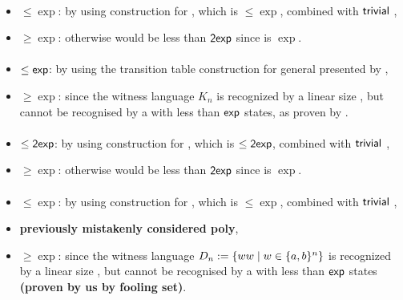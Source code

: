 \paragraph{\OMOLA{}\tto\TNFA}
\begin{itemize}
	\item $\le\exp$: by using construction for \hyperref[cost:OM1LAto1NFA]{\OMOLA{}\tto\ONFA}, which is $\le\exp$, combined with $\mathsf{trivial}$ \ONFA{}\tto\TNFA,
	\item $\ge\exp$: otherwise \hyperref[cost:OM1LAto1DFA]{\OMOLA{}\tto\ODFA} would be less than $\mathsf{2exp}$ since \hyperref[cost:2NFAto1DFA]{\TNFA{}\tto\ODFA} is $\exp$.
\end{itemize}
\paragraph{\OMODLA{}\tto\ODFA}\label{cost:OM1DLAto1DFA}
\begin{itemize}
	\item $\le\mathsf{exp}$: by using the transition table construction for general \OLA presented by ,
	\item $\ge\exp$: since the witness language $K_n$ is recognized by a linear size \OMODLA, but cannot be recognised by a \TNFA with less than $\mathsf{exp}$ states, as proven by .
\end{itemize}
\paragraph{\OMOLA{}\tto\OMODLA}
\begin{itemize}
	\item $\le\mathsf{2exp}$: by using construction for \hyperref[cost:OM1LAto1DFA]{\OMOLA{}\tto\ODFA}, which is $\le\mathsf{2exp}$, combined with $\mathsf{trivial}$ \ODFA{}\tto\OMODLA,
	\item $\ge\exp$: otherwise \hyperref[cost:OM1LAto1DFA]{\OMOLA{}\tto\ODFA} would be less than $\mathsf{2exp}$ since \hyperref[cost:OM1DLAto1DFA]{\OMODLA{}\tto\ODFA} is $\exp$.
\end{itemize}
\paragraph{\OMODLA{}\tto\ONFA}
\begin{itemize}
	\item $\le\exp$: by using construction for \hyperref[cost:OM1DLAto1DFA]{\OMODLA{}\tto\ODFA}, which is $\le\exp$, combined with $\mathsf{trivial}$ \ODFA{}\tto\ONFA,
	\item \textbf{previously mistakenly considered poly},
	\item $\ge\exp$: since the witness language $D_n:=\{ww\mid w\in\{a,b\}^n\}$ is recognized by a linear size \OMODLA, but cannot be recognised by a \ONFA with less than $\mathsf{exp}$ states \textbf{(proven by us by fooling set)}.
\end{itemize}
